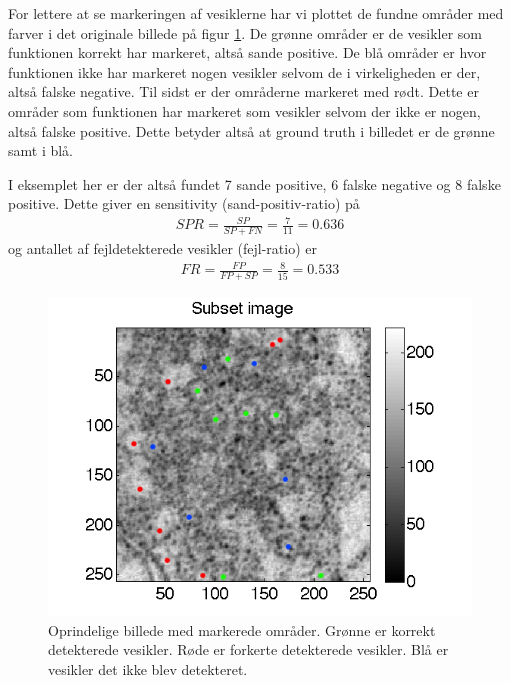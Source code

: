 For lettere at se markeringen af vesiklerne har vi plottet de fundne områder med farver i det originale billede på figur \ref{fig:postmethod_conv_photoshop}. De grønne områder er de vesikler som funktionen korrekt har markeret, altså sande positive. De blå områder er hvor funktionen ikke har markeret nogen vesikler selvom de i virkeligheden er der, altså falske negative. Til sidst er der områderne markeret med rødt. Dette er områder som funktionen har markeret som vesikler selvom der ikke er nogen, altså falske positive. Dette betyder altså at ground truth i billedet er de grønne samt i blå.

I eksemplet her er der altså fundet 7 sande positive, 6 falske negative og 8 falske positive. Dette giver en sensitivity (sand-positiv-ratio) på
\begin{align}
	SPR = \frac{SP}{SP+FN} = \frac{7}{11} = 0.636
\end{align}
og antallet af fejldetekterede vesikler (fejl-ratio) er
\begin{align}
	FR = \frac{FP}{FP+SP} = \frac{8}{15} = 0.533
\end{align}
\begin{figure}[H]
		\centering
		\includegraphics[scale=1]{files/postmethod/img/conv_5.png}
	\caption{Oprindelige billede med markerede områder. Grønne er korrekt detekterede vesikler. Røde er forkerte detekterede vesikler. Blå er vesikler det ikke blev detekteret.\label{fig:postmethod_conv_photoshop}}
\end{figure}

